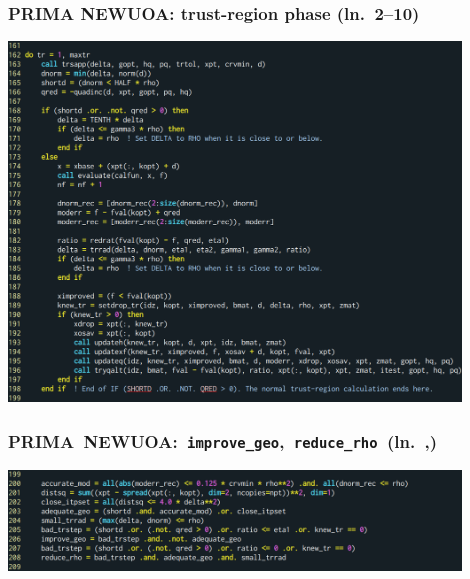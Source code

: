 \documentclass[slidestop,mathserif,xcolor=dvipsnames]{beamer}
\begin{document}
\begin{frame}
    \frametitle{PRIMA NEWUOA: trust-region phase (ln.~2--10)}
    \vspace{-2.2ex}
    \begin{center}
        \includegraphics[width=0.9\textwidth]{newuoa_tr.png}
    \end{center}
\end{frame}

\begin{frame}
    \frametitle{\mbox{PRIMA NEWUOA: \texttt{improve\_geo}, \texttt{reduce\_rho} (ln.~,)}}
    \vspace{12ex}
    \begin{center}
        \includegraphics[width=0.9\textwidth]{newuoa_geo_rho.png}
    \end{center}
\end{frame}
\end{document}
